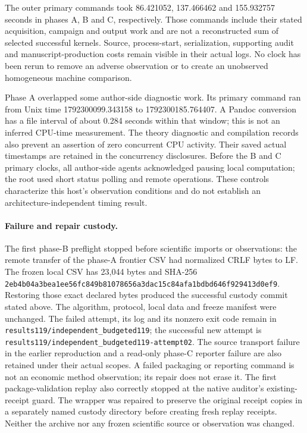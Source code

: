 The outer primary commands took 86.421052, 137.466462 and 155.932757 seconds
in phases A, B and C, respectively. Those commands include their stated
acquisition, campaign and output work and are not a reconstructed sum of
selected successful kernels. Source, process-start, serialization, supporting
audit and manuscript-production costs remain visible in their actual logs.
No clock has been rerun to remove an adverse observation or to create an
unobserved homogeneous machine comparison.

Phase A overlapped some author-side diagnostic work. Its primary command
ran from Unix time 1792300099.343158 to 1792300185.764407. A Pandoc conversion
has a file interval of about 0.284 seconds within that window; this is not
an inferred CPU-time measurement. The theory diagnostic and compilation
records also prevent an assertion of zero concurrent CPU activity. Their
saved actual timestamps are retained in the concurrency disclosures. Before
the B and C primary clocks, all author-side agents acknowledged pausing
local computation; the root used short status polling and remote operations.
These controls characterize this host's observation conditions and do not
establish an architecture-independent timing result.

\paragraph{Failure and repair custody.}
The first phase-B preflight stopped before scientific imports or observations:
the remote transfer of the phase-A frontier CSV had normalized CRLF bytes to
LF. The frozen local CSV has 23,044 bytes and SHA-256
\nolinkurl{2eb4b04a3bea1ee56fc849b81078656a3dac15c84afa1bdbd646f929413d0ef9}.
Restoring those exact declared bytes produced the successful custody commit
stated above. The algorithm, protocol, local data and freeze manifest were
unchanged. The failed attempt, its log and its nonzero exit code remain in
\nolinkurl{results119/independent_budgeted119}; the successful new attempt is
\nolinkurl{results119/independent_budgeted119-attempt02}. The source transport
failure in the earlier reproduction and a read-only phase-C reporter failure
are also retained under their actual scopes. A failed packaging or reporting
command is not an economic method observation; its repair does not erase it.
The first package-validation replay also correctly stopped at the native
auditor's existing-receipt guard. The wrapper was repaired to preserve the
original receipt copies in a separately named custody directory before
creating fresh replay receipts. Neither the archive nor any frozen scientific
source or observation was changed.

